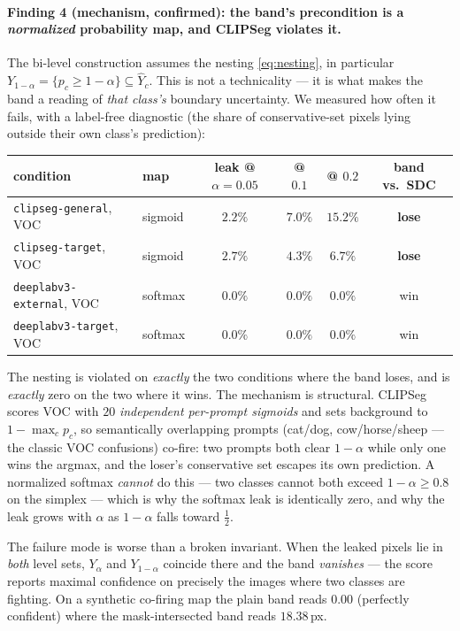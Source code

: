 \documentclass[11pt]{article}
\theoremstyle{remark}
\newcommand{\Yhat}{\widehat{Y}}
\newcommand{\Ylo}{Y_{\alpha}}
\newcommand{\Yhi}{Y_{1-\alpha}}
\begin{document}
\paragraph{Finding 4 (mechanism, confirmed): the band's precondition is a
\emph{normalized} probability map, and CLIPSeg violates it.} The bi-level
construction assumes the nesting \eqref{eq:nesting}, in particular
$\Yhi = \{p_c \ge 1-\alpha\} \subseteq \Yhat_c$. This is not a technicality --- it is
what makes the band a reading of \emph{that class's} boundary uncertainty. We
measured how often it fails, with a label-free diagnostic (the share of
conservative-set pixels lying outside their own class's prediction):

\begin{center}
\small
\begin{tabular}{llcccc}
\toprule
condition & map & leak @ $\alpha{=}0.05$ & @ $0.1$ & @ $0.2$ & band vs.\ SDC \\
\midrule
\texttt{clipseg-general}, VOC   & sigmoid & $2.2\%$ & $7.0\%$ & $15.2\%$ & \textbf{lose} \\
\texttt{clipseg-target}, VOC    & sigmoid & $2.7\%$ & $4.3\%$ & $6.7\%$  & \textbf{lose} \\
\texttt{deeplabv3-external}, VOC& softmax & $\mathbf{0.0\%}$ & $\mathbf{0.0\%}$ & $\mathbf{0.0\%}$ & win \\
\texttt{deeplabv3-target}, VOC  & softmax & $\mathbf{0.0\%}$ & $\mathbf{0.0\%}$ & $\mathbf{0.0\%}$ & win \\
\bottomrule
\end{tabular}
\end{center}

The nesting is violated on \emph{exactly} the two conditions where the band loses,
and is \emph{exactly} zero on the two where it wins. The mechanism is structural.
CLIPSeg scores VOC with $20$ \emph{independent per-prompt sigmoids} and sets
background to $1-\max_c p_c$, so semantically overlapping prompts (cat/dog,
cow/horse/sheep --- the classic VOC confusions) co-fire: two prompts both clear
$1-\alpha$ while only one wins the argmax, and the loser's conservative set escapes
its own prediction. A normalized softmax \emph{cannot} do this --- two classes cannot
both exceed $1-\alpha \ge 0.8$ on the simplex --- which is why the softmax leak is
identically zero, and why the leak grows with $\alpha$ as $1-\alpha$ falls toward
$\tfrac12$.

The failure mode is worse than a broken invariant. When the leaked pixels lie in
\emph{both} level sets, $\Ylo$ and $\Yhi$ coincide there and the band \emph{vanishes}
--- the score reports maximal confidence on precisely the images where two classes
are fighting. On a synthetic co-firing map the plain band reads $0.00$ (perfectly
confident) where the mask-intersected band reads $18.38$\,px.
\end{document}
